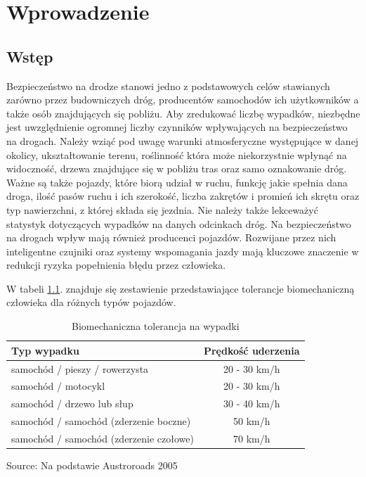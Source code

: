 \chapter{Wprowadzenie}
\label{cha:wprowadzenie}


\section{Wstęp}
\label{sec:wstep}

Bezpieczeństwo na drodze stanowi jedno z podstawowych celów stawianych zarówno przez budowniczych dróg, producentów samochodów ich użytkowników a także osób znajdujących się pobliżu. Aby zredukować liczbę wypadków, niezbędne jest uwzględnienie ogromnej liczby czynników wpływających na bezpieczeństwo na drogach. Należy wziąć pod uwagę warunki atmosferyczne występujące w danej okolicy, ukształtowanie terenu, roślinność która może niekorzystnie wpłynąć na widoczność, drzewa znajdujące się w pobliżu tras oraz samo oznakowanie dróg. Ważne są także pojazdy, które biorą udział w ruchu, funkcję jakie spełnia dana droga, ilość pasów ruchu i ich szerokość, liczba zakrętów i promień ich skrętu oraz typ nawierzchni, z której składa się jezdnia. Nie należy także lekceważyć statystyk dotyczących wypadków na danych odcinkach dróg. Na bezpieczeństwo na drogach wpływ mają również producenci pojazdów. Rozwijane przez nich inteligentne czujniki oraz systemy wspomagania jazdy mają kluczowe znaczenie w redukcji ryzyka popełnienia błędu przez człowieka.

W tabeli \ref{BiomechanicznaToleracja}. znajduje się zestawienie przedstawiające tolerancje biomechaniczną człowieka dla różnych typów pojazdów.

\newcommand{\source}[1]{\caption*{Source: {#1}} }

\begin{table}[ht]
\centering
\caption{Biomechaniczna tolerancja na wypadki}
\label{BiomechanicznaToleracja}
\begin{tabular}{| l | c |}
\hline
\textbf{Typ wypadku}                    & \textbf{Prędkość uderzenia} \\ \hline
samochód / pieszy / rowerzysta          & 20 - 30 km/h                                    \\ \hline
samochód / motocykl                     & 20 - 30 km/h                                    \\ \hline
samochód / drzewo lub słup              & 30 - 40 km/h                                    \\ \hline
samochód / samochód (zderzenie boczne)  & 50 km/h                                         \\ \hline
samochód / samochód (zderzenie czołowe) & 70 km/h   \\ \hline
\end{tabular}
\source{Na podstawie Austroroads 2005}
\end{table}


